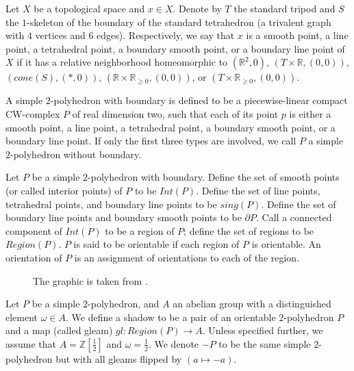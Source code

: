 \begin{definition}\label{def/local-shape}
  Let $X$ be a topological space and $x \in X$. Denote by $T$ the
  standard tripod and $S$ the $1$-skeleton of the boundary of the
  standard tetrahedron (a trivalent graph with $4$ vertices and
  $6$ edges). Respectively, we say that $x$ is a smooth point, a
  line point, a tetrahedral point, a boundary smooth point, or a
  boundary line point of $X$ if it has a relative neighborhood
  homeomorphic to $(\mathbb{R}^{2},0)$,
  $(T \times \mathbb{R}, (0, 0))$, $(cone(S), (*, 0))$,
  $(\mathbb{R} \times \mathbb{R}_{\geq 0}, (0, 0))$, or
  $(T \times \mathbb{R}_{\geq 0}, (0, 0))$.
\end{definition}

\begin{definition}\label{def/simple-2-polyhedron}
  A simple $2$-polyhedron with boundary is defined to be a
  piecewise-linear compact CW-complex $P$ of real dimension two,
  such that each of its point $p$ is either a smooth point, a
  line point, a tetrahedral point, a boundary smooth point, or a
  boundary line point. If only the first three types are
  involved, we call $P$ a simple $2$-polyhedron without boundary.
\end{definition}

\begin{definition}\label{def/components-of-a-simple-2-polyhedron}
  Let $P$ be a simple $2$-polyhedron with boundary. Define the
  set of smooth points (or called interior points) of $P$ to be
  $Int(P)$. Define the set of line points, tetrahedral points,
  and boundary line points to be $sing(P)$. Define the set of
  boundary line points and boundary smooth points to be
  $\partial P$. Call a connected component of $Int(P)$ to be a
  region of $P$; define the set of regions to be $Region(P)$. $P$
  is said to be orientable if each region of $P$ is orientable.
  An orientation of $P$ is an assignment of orientations to each
  of the region.
\end{definition}

\begin{figure}[ht]
\centering
\begin{tikzpicture}

\end{tikzpicture}
\caption{The graphic is taken from \cite{khovanov-robert/foam}.}
\label{figure/3localmodel}
\end{figure}

\begin{definition}\label{def/shadowed-2-polyhedron}
  Let $P$ be a simple $2$-polyhedron, and $A$ an abelian group
  with a distinguished element $\omega \in A$. We define a shadow
  to be a pair of an orientable $2$-polyhedron $P$ and a map
  (called gleam) $gl: Region(P) \to A$. Unless specified further,
  we assume that $A = \mathbb{Z}\left[\frac{1}{2}\right]$ and
  $\omega = \frac{1}{2}$. We denote $-P$ to be the same simple
  $2$-polyhedron but with all gleams flipped by $(a \mapsto -a)$.
\end{definition}

